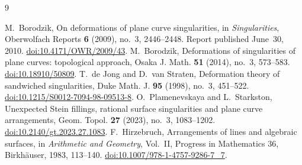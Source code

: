 \documentclass[11pt]{article}
\begin{document}
\clearpage
\begin{thebibliography}{9}
\raggedright
{} M.~Borodzik, On deformations of plane curve singularities,
in \emph{Singularities}, Oberwolfach Reports \textbf{6} (2009), no.~3,
2446--2448. Report published June~30, 2010.
\href{https://doi.org/10.4171/OWR/2009/43}{doi:10.4171/OWR/2009/43}.
 M.~Borodzik, Deformations of singularities of plane curves:
topological approach, Osaka J. Math. \textbf{51} (2014), no.~3, 573--583.
\href{https://doi.org/10.18910/50809}{doi:10.18910/50809}.
 T.~de Jong and D.~van Straten, Deformation theory of
sandwiched singularities, Duke Math. J. \textbf{95} (1998), no.~3,
451--522. \href{https://doi.org/10.1215/S0012-7094-98-09513-8}{doi:10.1215/S0012-7094-98-09513-8}.
 O.~Plamenevskaya and L.~Starkston, Unexpected Stein fillings,
rational surface singularities and plane curve arrangements,
Geom. Topol. \textbf{27} (2023), no.~3, 1083--1202.
\href{https://doi.org/10.2140/gt.2023.27.1083}{doi:10.2140/gt.2023.27.1083}.
 F.~Hirzebruch, Arrangements of lines and algebraic surfaces,
in \emph{Arithmetic and Geometry}, Vol.~II, Progress in Mathematics 36,
Birkh\"auser, 1983, 113--140.
\href{https://doi.org/10.1007/978-1-4757-9286-7_7}{doi:10.1007/978-1-4757-9286-7\_7}.
\end{thebibliography}
\end{document}
